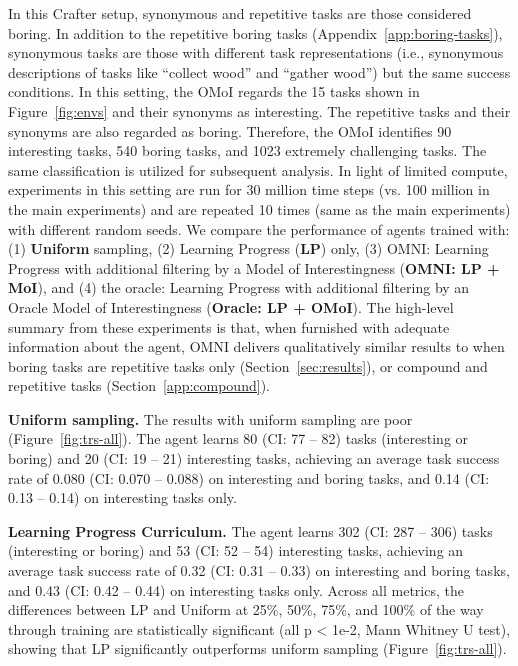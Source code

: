 \documentclass{article} %
\begin{document}
In this Crafter setup, synonymous and repetitive tasks are those considered boring. In addition to the repetitive boring tasks (Appendix~\ref{app:boring-tasks}), synonymous tasks are those with different task representations (i.e., synonymous descriptions of tasks like ``collect wood'' and ``gather wood'') but the same success conditions. In this setting, the OMoI regards the 15 tasks shown in Figure~\ref{fig:envs} and their synonyms as interesting. The repetitive tasks and their synonyms are also regarded as boring. Therefore, the OMoI identifies 90 interesting tasks, 540 boring tasks, and 1023 extremely challenging tasks. The same classification is utilized for subsequent analysis. In light of limited compute, experiments in this setting are run for 30 million time steps (vs. 100 million in the main experiments) and are repeated 10 times (same as the main experiments) with different random seeds. We compare the performance of agents trained with: (1) \textbf{Uniform} sampling, (2) Learning Progress (\textbf{LP}) only, (3) OMNI: Learning Progress with additional filtering by a Model of Interestingness (\textbf{OMNI: LP + MoI}), and (4) the oracle: Learning Progress with additional filtering by an Oracle Model of Interestingness (\textbf{Oracle: LP + OMoI}). The high-level summary from these experiments is that, when furnished with adequate information about the agent, OMNI delivers qualitatively similar results to when boring tasks are repetitive tasks only (Section~\ref{sec:results}), or compound and repetitive tasks (Section~\ref{app:compound}).

\textbf{Uniform sampling.} The results with uniform sampling are poor (Figure~\ref{fig:trs-all}). The agent learns 80 (CI: 77 -- 82) tasks (interesting or boring) and 20 (CI: 19 -- 21) interesting tasks, achieving an average task success rate of 0.080 (CI: 0.070 -- 0.088) on interesting and boring tasks, and 0.14 (CI: 0.13 -- 0.14) on interesting tasks only.

\textbf{Learning Progress Curriculum.} The agent learns 302 (CI: 287 -- 306) tasks (interesting or boring) and 53 (CI: 52 -- 54) interesting tasks, achieving an average task success rate of 0.32 (CI: 0.31 -- 0.33) on interesting and boring tasks, and 0.43 (CI: 0.42 -- 0.44) on interesting tasks only. Across all metrics, the differences between LP and Uniform at 25\%, 50\%, 75\%, and 100\% of the way through training are statistically significant (all p < 1e-2, Mann Whitney U test), showing that LP significantly outperforms uniform sampling (Figure~\ref{fig:trs-all}).
\end{document}
